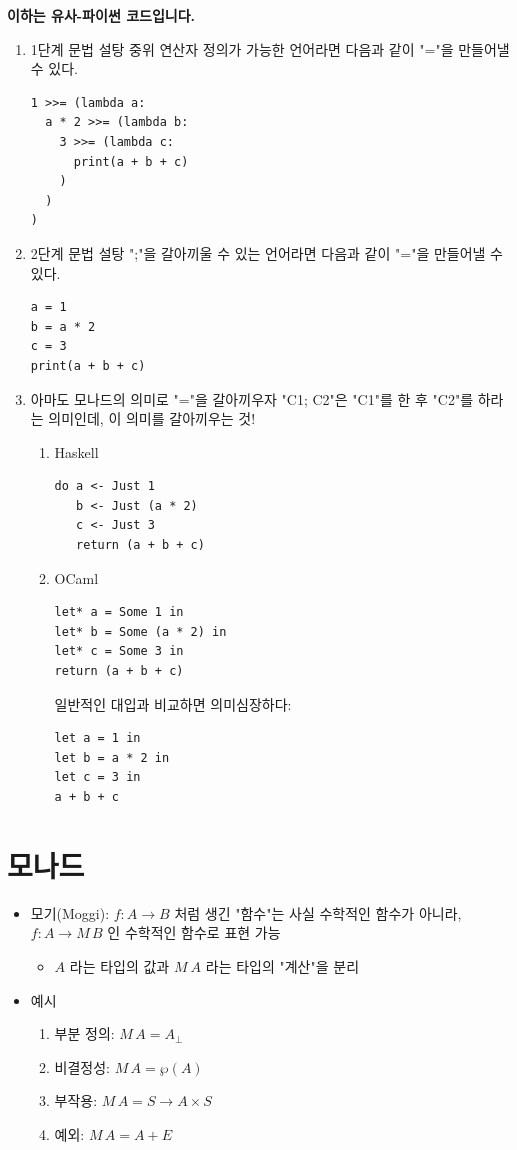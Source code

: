 \documentclass[a4paper,11pt]{article}
\begin{document}
\textbf{이하는 유사-파이썬 코드입니다.}
\begin{enumerate}
\item 1단계 문법 설탕
\label{sec:org0b0f6d1}
중위 연산자 정의가 가능한 언어라면 다음과 같이 "="을 만들어낼 수 있다.
\begin{verbatim}
1 >>= (lambda a:
  a * 2 >>= (lambda b:
    3 >>= (lambda c:
      print(a + b + c)
    )
  )
)
\end{verbatim}

\item 2단계 문법 설탕
\label{sec:org2c00f69}
";"을 갈아끼울 수 있는 언어라면 다음과 같이 "="을 만들어낼 수 있다.
\begin{verbatim}
a = 1
b = a * 2
c = 3
print(a + b + c)
\end{verbatim}

\item 아마도 모나드의 의미로 "="을 갈아끼우자
\label{sec:org99b5522}
"C1; C2"은 "C1"를 한 후 "C2"를 하라는 의미인데, 이 의미를 갈아끼우는 것!

\begin{enumerate}
\item Haskell
\label{sec:orge447b01}
\begin{verbatim}
do a <- Just 1
   b <- Just (a * 2)
   c <- Just 3
   return (a + b + c)
\end{verbatim}

\item OCaml
\label{sec:orgbe4def9}
\begin{verbatim}
let* a = Some 1 in
let* b = Some (a * 2) in
let* c = Some 3 in
return (a + b + c)
\end{verbatim}

일반적인 대입과 비교하면 의미심장하다:
\begin{verbatim}
let a = 1 in
let b = a * 2 in
let c = 3 in
a + b + c
\end{verbatim}
\end{enumerate}
\end{enumerate}

\section{모나드}
\label{sec:org75c98e0}
\begin{itemize}
\item 모기(Moggi): \(f: A \to B\) 처럼 생긴 "함수"는 사실 수학적인 함수가 아니라, \(f: A \to M\,B\) 인 수학적인 함수로 표현 가능
\begin{itemize}
\item \(A\) 라는 타입의 값과 \(M\ A\) 라는 타입의 "계산"을 분리
\end{itemize}
\item 예시
\begin{enumerate}
\item 부분 정의: \(M\,A = A_\bot\)
\item 비결정성: \(M\,A = \wp(A)\)
\item 부작용: \(M\,A = S \to A \times S\)
\item 예외: \(M\,A = A + E\)
\end{enumerate}
\end{itemize}
\end{document}
